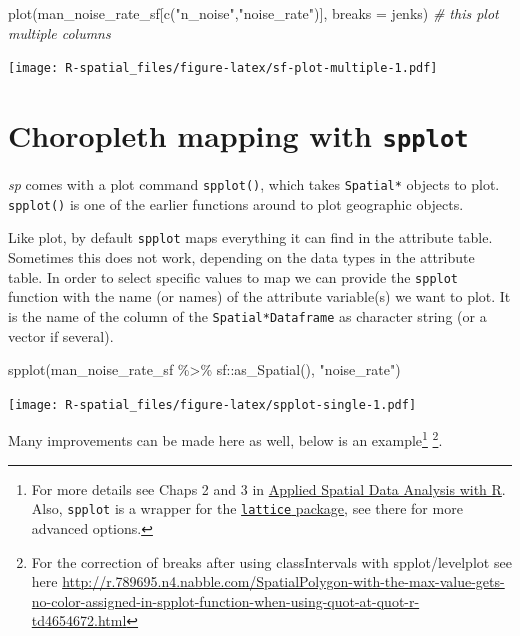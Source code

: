 \documentclass[
  11pt,
]{book}
\newenvironment{Shaded}{\begin{snugshade}}{\end{snugshade}}
\newcommand{\AttributeTok}[1]{\textcolor[rgb]{0.77,0.63,0.00}{#1}}
\newcommand{\CommentTok}[1]{\textcolor[rgb]{0.56,0.35,0.01}{\textit{#1}}}
\newcommand{\FunctionTok}[1]{\textcolor[rgb]{0.00,0.00,0.00}{#1}}
\newcommand{\NormalTok}[1]{#1}
\newcommand{\SpecialCharTok}[1]{\textcolor[rgb]{0.00,0.00,0.00}{#1}}
\newcommand{\StringTok}[1]{\textcolor[rgb]{0.31,0.60,0.02}{#1}}
\begin{document}
\begin{Shaded}
\begin{Highlighting}[]
\FunctionTok{plot}\NormalTok{(man\_noise\_rate\_sf[}\FunctionTok{c}\NormalTok{(}\StringTok{"n\_noise"}\NormalTok{,}\StringTok{"noise\_rate"}\NormalTok{)], }\AttributeTok{breaks =} \StringTok{\textquotesingle{}jenks\textquotesingle{}}\NormalTok{) }\CommentTok{\# this plot multiple columns}
\end{Highlighting}
\end{Shaded}

\texttt{[image: R-spatial\_files/figure-latex/sf-plot-multiple-1.pdf]}

\hypertarget{choropleth-mapping-with-spplot}{%
\section{\texorpdfstring{Choropleth mapping with \texttt{spplot}}{Choropleth mapping with spplot}}\label{choropleth-mapping-with-spplot}}

\emph{sp} comes with a plot command \texttt{spplot()}, which takes \texttt{Spatial*} objects to plot. \texttt{spplot()} is one of the earlier functions around to plot geographic objects.

Like plot, by default \texttt{spplot} maps everything it can find in the attribute table. Sometimes this does not work, depending on the data types in the attribute table. In order to select specific values to map we can provide the \texttt{spplot} function with the name (or names) of the attribute variable(s) we want to plot. It is the name of the column of the \texttt{Spatial*Dataframe} as character string (or a vector if several).

\begin{Shaded}
\begin{Highlighting}[]
\FunctionTok{spplot}\NormalTok{(man\_noise\_rate\_sf }\SpecialCharTok{\%\textgreater{}\%}\NormalTok{ sf}\SpecialCharTok{::}\FunctionTok{as\_Spatial}\NormalTok{(), }\StringTok{"noise\_rate"}\NormalTok{)}
\end{Highlighting}
\end{Shaded}

\texttt{[image: R-spatial\_files/figure-latex/spplot-single-1.pdf]}

Many improvements can be made here as well, below is an example\footnote{For more details see Chaps 2 and 3 in \href{https://asdar-book.org}{Applied Spatial Data Analysis with R}. Also, \texttt{spplot} is a wrapper for the \href{https://cran.r-project.org/package=lattice}{\texttt{lattice} package}, see there for more advanced options.} \footnote{For the correction of breaks after using classIntervals with spplot/levelplot see here \url{http://r.789695.n4.nabble.com/SpatialPolygon-with-the-max-value-gets-no-color-assigned-in-spplot-function-when-using-quot-at-quot-r-td4654672.html}}.
\end{document}
